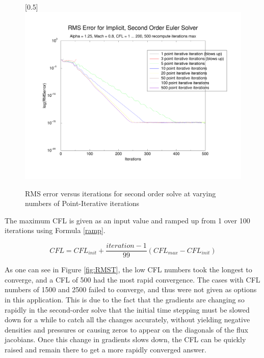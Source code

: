 \documentclass[letterpaper,twoside,11pt,openright,pdf]{book} %
\def\eqstart{\begin{equation}}
\def\eqend{\end{equation}}
\begin{document}
\begin{center}
\begin{figure}[h]
\centering
\scalebox{0.5}[0.5]{\includegraphics{RMSiterative.pdf}}
\caption{RMS error versus iterations for second order solve at varying numbers of Point-Iterative iterations}
\label{fig:RMSI}
\end{figure}
\end{center}

The maximum CFL is given as an input value and ramped up from 1 over 100 iterations using Formula \ref{ramp}.  

\eqstart
CFL = CFL_{init} + \frac{iteration - 1}{99}(CFL_{max} - CFL_{init})
\label{ramp}
\eqend

As one can see in Figure \ref{fig:RMST}, the low CFL numbers took the longest to converge, and a CFL of 500 had the most rapid convergence.  The cases with CFL numbers of 1500 and 2500 failed to converge, and thus were not given as options in this application.  This is due to the fact that the gradients are changing so rapidly in the second-order solve that the initial time stepping must be slowed down for a while to catch all the changes accurately, without yielding negative densities and pressures or causing zeros to appear on the diagonals of the flux jacobians. Once this change in gradients slows down, the CFL can be quickly raised and remain there to get a more rapidly converged answer.
\end{document}

